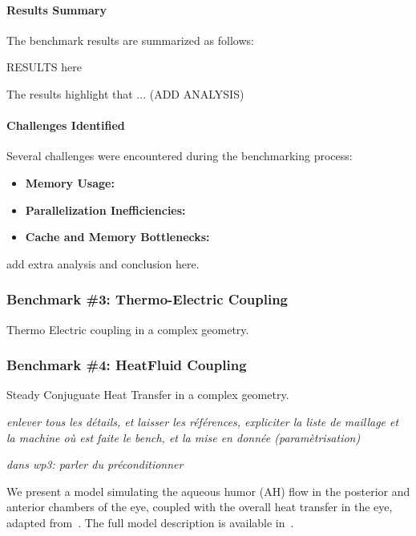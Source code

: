 \paragraph{Results Summary}
The benchmark results are summarized as follows:

RESULTS here

The results highlight that ... (ADD ANALYSIS)

\paragraph{Challenges Identified}
Several challenges were encountered during the benchmarking process:
\begin{itemize}
    \item \textbf{Memory Usage:}
    \item \textbf{Parallelization Inefficiencies:}
    \item \textbf{Cache and Memory Bottlenecks:}
\end{itemize}

add extra analysis  and conclusion here.

\subsubsection{Benchmark \#3: Thermo-Electric Coupling}

Thermo Electric coupling in a complex geometry.








\subsubsection{Benchmark \#4: HeatFluid Coupling}

\newcommand{\vct}[1]{\vec{#1}}
\newcommand{\mat}[1]{\underline{\underline{#1}}}

Steady Conjuguate Heat Transfer in a complex geometry.


\emph{enlever tous les détails, et laisser les références, expliciter la liste de maillage et la machine où est faite le bench, et la mise en donnée (paramètrisation)}

\emph{dans wp3: parler du préconditionner}



We present a model simulating the aqueous humor (AH) flow in the posterior and anterior chambers of the eye, coupled with the overall heat transfer in the eye, adapted from~\cite{ooi_simulation_2008,kilgour_operator_2021}.
The full model description is available in~\cite{saigre_coupled_2024}.


